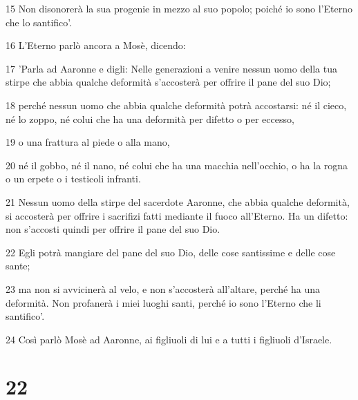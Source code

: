 \par 15 Non disonorerà la sua progenie in mezzo al suo popolo; poiché io sono l'Eterno che lo santifico'.
\par 16 L'Eterno parlò ancora a Mosè, dicendo:
\par 17 'Parla ad Aaronne e digli: Nelle generazioni a venire nessun uomo della tua stirpe che abbia qualche deformità s'accosterà per offrire il pane del suo Dio;
\par 18 perché nessun uomo che abbia qualche deformità potrà accostarsi: né il cieco, né lo zoppo, né colui che ha una deformità per difetto o per eccesso,
\par 19 o una frattura al piede o alla mano,
\par 20 né il gobbo, né il nano, né colui che ha una macchia nell'occhio, o ha la rogna o un erpete o i testicoli infranti.
\par 21 Nessun uomo della stirpe del sacerdote Aaronne, che abbia qualche deformità, si accosterà per offrire i sacrifizi fatti mediante il fuoco all'Eterno. Ha un difetto: non s'accosti quindi per offrire il pane del suo Dio.
\par 22 Egli potrà mangiare del pane del suo Dio, delle cose santissime e delle cose sante;
\par 23 ma non si avvicinerà al velo, e non s'accosterà all'altare, perché ha una deformità. Non profanerà i miei luoghi santi, perché io sono l'Eterno che li santifico'.
\par 24 Così parlò Mosè ad Aaronne, ai figliuoli di lui e a tutti i figliuoli d'Israele.

\chapter{22}

